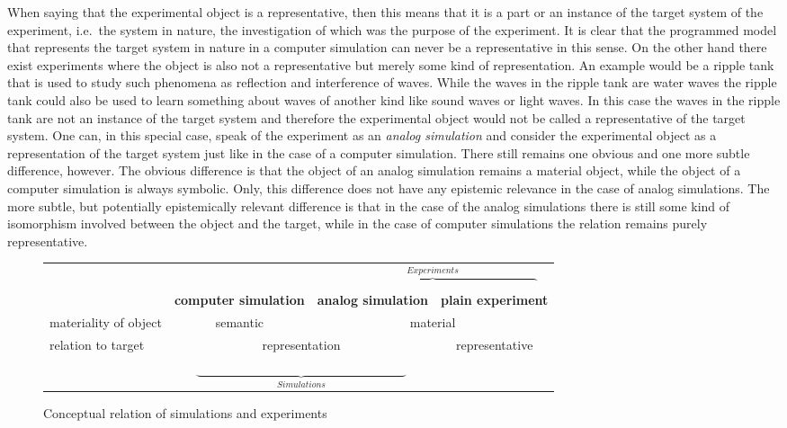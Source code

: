 \documentclass[12pt, a4paper]{article}
\numberwithin{equation}{section}
\begin{document}
When saying that the experimental object is a representative, then this means that it is a part or an instance of the target system of the experiment, i.e.\ the system in nature, the investigation of which was the purpose of the experiment. It is clear that the programmed model that represents the target system in nature in a computer simulation can never be a representative in this sense. On the other hand there exist experiments where the object is also not a representative but merely some kind of representation. An example would be a ripple tank that is used to study such phenomena as reflection and interference of waves. While the waves in the ripple tank are water waves the ripple tank could also be used to learn something about waves of another kind like sound waves or light waves. In this case the waves in the ripple tank are not an instance of the target system and therefore the experimental object would not be called a representative of the target system. One can, in this special case, speak of the experiment as an {\em analog simulation} and consider the experimental object as a representation of the target system just like in the case of a computer simulation. There still remains one obvious and one more subtle difference, however. The obvious difference is that the object of an analog simulation remains a material object, while the object of a computer simulation is always symbolic. Only, this difference does not have any epistemic relevance in the case of analog simulations. The more subtle, but potentially epistemically relevant difference is that in the case of the analog simulations there is still some kind of isomorphism involved between the object and the target, while in the case of computer simulations the relation remains purely representative.

\begin{figure}

\begin{small}
\begin{center}
\begin{tabular}{l|c|c|c|} 
\multicolumn{1}{c}{ } & \multicolumn{1}{c}{ } & \multicolumn{2}{c}{$\overbrace{\hspace{7cm}}^{Experiments}$} \\ \cline{2-4}
                      & {\bf computer simulation} & {\bf analog simulation} & {\bf plain experiment} \\ \hline
materiality of object
                      & semantic              & \multicolumn{2}{c|}{material} \\ \hline
relation to target  
			          & \multicolumn{2}{c|}{representation}       & representative \\ \hline
\multicolumn{1}{c}{ } & \multicolumn{2}{c}{$\underbrace{\hspace{7cm}}_{Simulations}$} & \multicolumn{1}{c}{ } \\
\end{tabular}
\end{center}
\end{small}
\caption{Conceptual relation of simulations and experiments}\label{SimulationExperimentsScheme} 

\end{figure}
\end{document}
